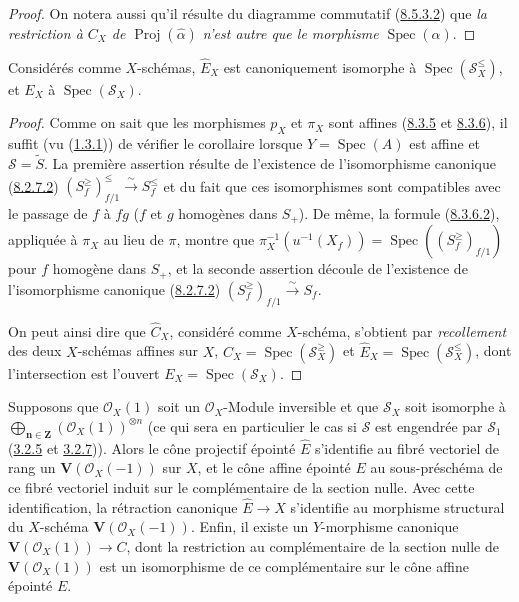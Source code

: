 \begin{proof}
On notera aussi qu'il résulte du diagramme commutatif
(\hyperref[II.8.5.3.2-fr]{8.5.3.2}) que \emph{la restriction à $C_X$ de
$\operatorname{Proj}(\widehat{\alpha})$ n'est autre que le morphisme
$\operatorname{Spec}(\alpha)$}.
\end{proof}

\begin{corollary}[8.6.3]
\label{II.8.6.3-fr}
Considérés comme $X$-schémas, $\widehat{E}_X$ est canoniquement isomorphe à
$\operatorname{Spec}(\mathcal{S}_X^{\leq})$, et $E_X$ à
$\operatorname{Spec}(\mathcal{S}_X)$.
\end{corollary}

\begin{proof}
Comme on sait que les morphismes $p_X$ et $\pi_X$ sont affines
(\hyperref[II.8.3.5-fr]{8.3.5} et
\hyperref[II.8.3.6-fr]{8.3.6}), il suffit (vu
(\hyperref[II.1.3.1-fr]{1.3.1})) de vérifier le corollaire lorsque
$Y=\operatorname{Spec}(A)$ est affine et $\mathcal{S}=\widetilde{S}$. La
première assertion résulte de l'existence de l'isomorphisme canonique
(\hyperref[II.8.2.7.2-fr]{8.2.7.2})
$(S_f^{\geq})_{f/1}^{\leq}\xrightarrow{\sim}S_f^{\leq}$ et du fait que ces
isomorphismes sont compatibles avec le passage de $f$ à $fg$ ($f$ et $g$
homogènes dans $S_+$). De même, la formule
(\hyperref[II.8.3.6.2-fr]{8.3.6.2}), appliquée à $\pi_X$ au lieu de $\pi$,
montre que
$\pi_X^{-1}(u^{-1}(X_f))=
\operatorname{Spec}((S_f^{\geq})_{f/1})$ pour $f$ homogène dans $S_+$, et la
seconde assertion découle de l'existence de l'isomorphisme canonique
(\hyperref[II.8.2.7.2-fr]{8.2.7.2})
$(S_f^{\geq})_{f/1}\xrightarrow{\sim}S_f$.

On peut ainsi dire que $\widehat{C}_X$, considéré comme $X$-schéma, s'obtient
par \emph{recollement} des deux $X$-schémas affines sur $X$,
$C_X=\operatorname{Spec}(\mathcal{S}_X^{\geq})$ et
$\widehat{E}_X=\operatorname{Spec}(\mathcal{S}_X^{\leq})$, dont
l'intersection est l'ouvert $E_X=\operatorname{Spec}(\mathcal{S}_X)$.
\end{proof}

\begin{corollary}[8.6.4]
\label{II.8.6.4-fr}
Supposons que $\mathcal{O}_X(1)$ soit un $\mathcal{O}_X$-Module inversible et
que $\mathcal{S}_X$ soit isomorphe à
$\bigoplus_{\boldsymbol{n}\in\mathbf{Z}}(\mathcal{O}_X(1))^{\otimes n}$ (ce qui sera en
particulier le cas si $\mathcal{S}$ est engendrée par $\mathcal{S}_1$
\textup{(\hyperref[II.3.2.5-fr]{3.2.5}} et
\textup{\hyperref[II.3.2.7-fr]{3.2.7}))}. Alors le cône projectif épointé
$\widehat{E}$ s'identifie au fibré vectoriel de rang un
$\mathbf{V}(\mathcal{O}_X(-1))$ sur $X$, et le cône affine épointé $E$ au
sous-préschéma de ce fibré vectoriel induit sur le complémentaire de la
section nulle. Avec cette identification, la rétraction canonique
$\widehat{E}\to X$ s'identifie au morphisme structural du $X$-schéma
$\mathbf{V}(\mathcal{O}_X(-1))$. Enfin, il existe un $Y$-morphisme canonique
$\mathbf{V}(\mathcal{O}_X(1))\to C$, dont la restriction au complémentaire de
la section nulle de $\mathbf{V}(\mathcal{O}_X(1))$ est un isomorphisme de ce
complémentaire sur le cône affine épointé $E$.
\end{corollary}

